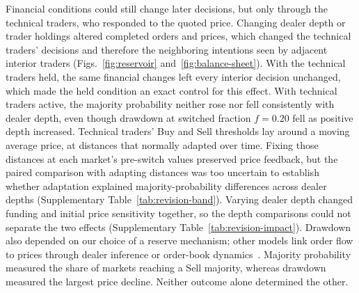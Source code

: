 Financial conditions could still change later decisions, but only
through the technical traders, who responded to the quoted price.
Changing dealer depth or trader holdings altered completed orders and
prices, which changed the technical traders' decisions and therefore
the neighboring intentions seen by adjacent interior traders
(Figs.~\ref{fig:reservoir} and~\ref{fig:balance-sheet}). With the
technical traders held, the same financial changes left every interior
decision unchanged, which made the held condition an exact control for
this effect. With technical traders active, the majority probability
neither rose nor fell consistently with dealer depth, even though
drawdown at switched fraction $f=0.20$ fell as positive depth increased.
Technical traders' Buy and Sell thresholds lay around a moving average
price, at distances that normally adapted over time. Fixing those
distances at each market's pre-switch values preserved price feedback,
but the paired comparison with adapting distances was too uncertain to
establish whether adaptation explained majority-probability differences
across dealer depths
(Supplementary Table~\ref{tab:revision-band}). Varying dealer depth changed
funding and initial price sensitivity together, so the depth comparisons
could not separate the two effects (Supplementary
Table~\ref{tab:revision-impact}). Drawdown also depended on our choice of a reserve mechanism; other
models link order flow to prices through dealer inference or order-book
dynamics~\cite{kyle1985continuous,farmer2005predictive,bouchaud2009how}.
Majority probability measured the share of markets reaching a Sell
majority, whereas drawdown measured the largest price decline. Neither
outcome alone determined the other.

